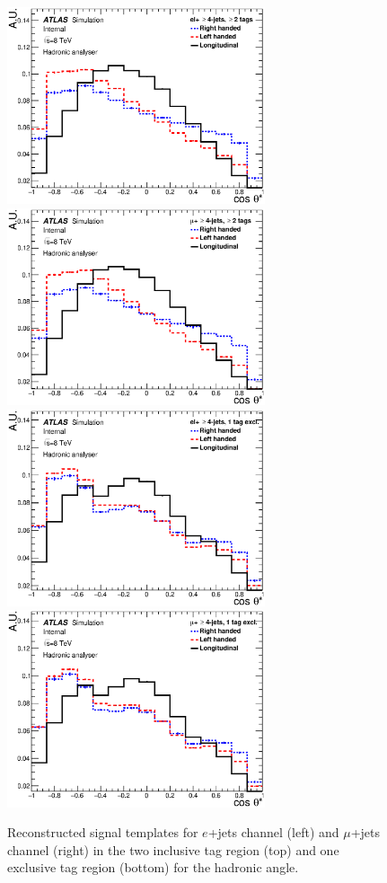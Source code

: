 \begin{figure}[!hb]
  \begin{center}
    \includegraphics[height=58mm]{chapters/whel/figures/templatePlots/Hadronic/Signal_Templates_2incl_el_had}
    \includegraphics[height=58mm]{chapters/whel/figures/templatePlots/Hadronic/Signal_Templates_2incl_mu_had}\\
    \includegraphics[height=58mm]{chapters/whel/figures/templatePlots/Hadronic/Signal_Templates_1excl_el_had}
    \includegraphics[height=58mm]{chapters/whel/figures/templatePlots/Hadronic/Signal_Templates_1excl_mu_had}
    \caption{Reconstructed signal templates for $e$+jets channel (left) and $\mu$+jets channel (right) in the two inclusive \bt tag region (top) and one exclusive \bt tag region (bottom) for the hadronic angle.}
    \label{fig:Sig_temp_had}
  \end{center}
\end{figure}

